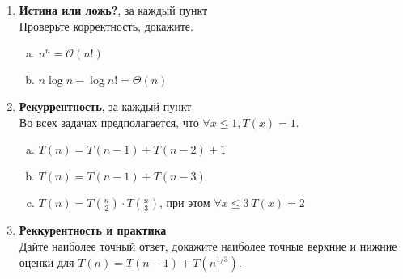 \documentclass[12pt]{article}
\def\O{\mathcal{O}}           %
\renewcommand{\le}{\leqslant} %
\newcommand{\mfrac}[2]{{\textstyle\frac{#1}{#2}}}    %
\newcommand{\score}[1]{{\bf\color{red}{(#1)}}}
\newenvironment{MyList}[1][4pt]{
  \begin{enumerate}[1.]
  \setlength{\parskip}{0pt}
  \setlength{\itemsep}{#1}
}{       
  \end{enumerate}
}
\newenvironment{InnerMyList}[1][0pt]{
  \vspace*{-0.5em}
  \begin{enumerate}[a)]
  \setlength{\parskip}{#1}
  \setlength{\itemsep}{0pt}
}{
  \end{enumerate}
}
\begin{document}
\begin{MyList}[8pt]

  \item \score{1} {\bf Истина или ложь?}, \score{0.5} за каждый пункт\\
    Проверьте корректность, докажите.
    \begin{InnerMyList}
      \setcounter{enumii}{16}
      \item $n^n = \O(n!)$
      \item $n \log n - \log n! = \Theta(n)$
    \end{InnerMyList}

  \item \score{1.5} {\bf Рекуррентность}, \score{0.5} за каждый пункт\\
    Во всех задачах предполагается, что $\forall x \le 1, T(x) = 1$.
    \begin{InnerMyList}
      \setcounter{enumii}{11}
      \item $T(n) = T(n - 1) + T(n - 2) + 1$
      \item $T(n) = T(n - 1) + T(n - 3)$
      \item $T(n) = T(\mfrac{n}{2}) \cdot T(\mfrac{n}{3})$, при этом $\forall x \le 3 \ T(x) = 2$
    \end{InnerMyList}

  \item \score{1} {\bf Реккурентность и практика}\\
    Дайте наиболее точный ответ, докажите наиболее точные верхние и нижние оценки для
    $T(n) = T(n-1) + T(n^{1/3})$.

\end{MyList}
\end{document}
